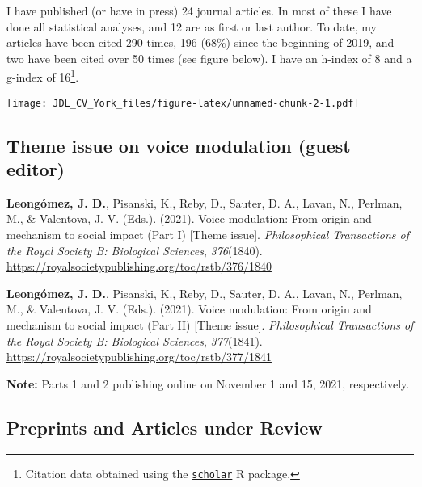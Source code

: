 \documentclass[11pt, a4paper]{awesome-cv}
\begin{document}
I have published (or have in press) 24 journal articles. In most of
these I have done all statistical analyses, and 12 are as first or last
author. To date, my articles have been cited 290 times, 196 (68\%) since
the beginning of 2019, and two have been cited over 50 times (see figure
below). I have an h-index of 8 and a g-index of 16\footnote{Citation
  data obtained using the
  \href{https://cran.r-project.org/web/packages/scholar/index.html}{\texttt{scholar}}
  R package.}.

\texttt{[image: JDL\_CV\_York\_files/figure-latex/unnamed-chunk-2-1.pdf]}

\hypertarget{section}{%
\subsection{\texorpdfstring{\textbf{Theme issue on voice modulation (guest editor)}}{}}\label{section}}

\begingroup
\setlength{\parindent}{-0.5in}
\setlength{\leftskip}{0.5in}

\hypertarget{refs_theme_issue}{}
\leavevmode{}%
\textbf{Leongómez, J. D.}, Pisanski, K., Reby, D., Sauter, D. A., Lavan,
N., Perlman, M., \& Valentova, J. V. (Eds.). (2021). Voice modulation:
From origin and mechanism to social impact ({Part I}) {[}{Theme
issue}{]}. \emph{Philosophical Transactions of the Royal Society B:
Biological Sciences}, \emph{376}(1840).
\url{https://royalsocietypublishing.org/toc/rstb/376/1840}

\leavevmode{}%
\textbf{Leongómez, J. D.}, Pisanski, K., Reby, D., Sauter, D. A., Lavan,
N., Perlman, M., \& Valentova, J. V. (Eds.). (2021). Voice modulation:
From origin and mechanism to social impact ({Part II}) {[}{Theme
issue}{]}. \emph{Philosophical Transactions of the Royal Society B:
Biological Sciences}, \emph{377}(1841).
\url{https://royalsocietypublishing.org/toc/rstb/377/1841}

\endgroup

\textbf{Note:} Parts 1 and 2 publishing online on November 1 and 15,
2021, respectively.

\hypertarget{section-1}{%
\subsection{\texorpdfstring{\textbf{Preprints and Articles under Review}}{}}\label{section-1}}

\begingroup
\setlength{\parindent}{-0.5in}
\setlength{\leftskip}{0.5in}
\end{document}
